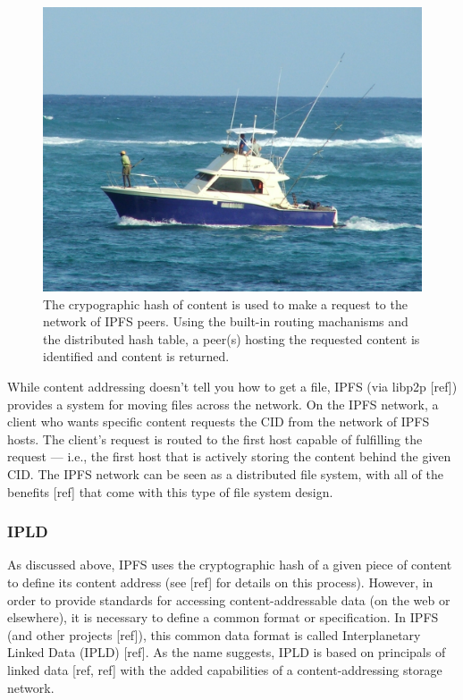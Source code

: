 \documentclass{comjnl}
\begin{document}
\begin{figure}
  \includegraphics[width=\linewidth]{boat.jpg}
  \caption{The crypographic hash of content is used to make a request to the network of IPFS peers. Using the built-in routing machanisms and the distributed hash table, a peer(s) hosting the requested content is identified and content is returned. }
  \label{fig:contentaddressing}
\end{figure}

While content addressing doesn’t tell you how to get a file, IPFS (via libp2p [ref]) provides a system for moving files across the network.  On the IPFS network, a client who wants specific content requests the CID from the network of IPFS hosts. The client's request is routed to the first host capable of fulfilling the request — i.e., the first host that is actively storing the content behind the given CID. The IPFS network can be seen as a distributed file system, with all of the benefits [ref] that come with this type of file system design.


\subsubsection{IPLD}

As discussed above, IPFS uses the cryptographic hash of a given piece of content to define its content address (see [ref] for details on this process). However, in order to provide standards for accessing content-addressable data (on the web or elsewhere), it is necessary to define a common format or specification. In IPFS (and other projects [ref]), this common data format is called Interplanetary Linked Data (IPLD) [ref]. As the name suggests, IPLD is based on principals of linked data [ref, ref] with the added capabilities of a content-addressing storage network. 
\end{document}
